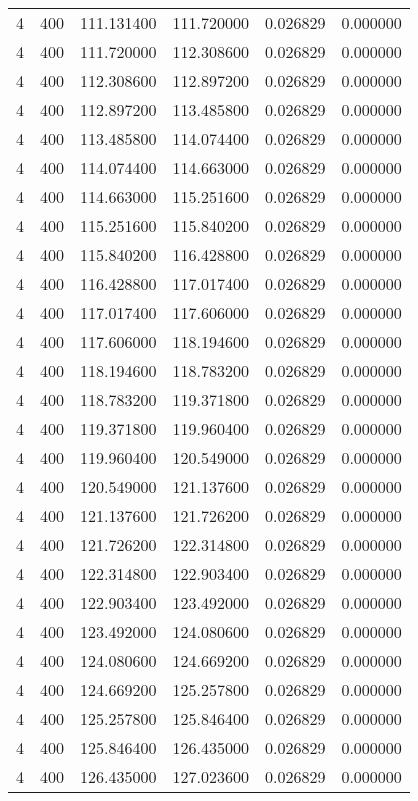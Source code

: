 \begin{longtable}{rrrrrr}
4 & 400 & 111.131400 & 111.720000 & 0.026829 & 0.000000 \\
4 & 400 & 111.720000 & 112.308600 & 0.026829 & 0.000000 \\
4 & 400 & 112.308600 & 112.897200 & 0.026829 & 0.000000 \\
4 & 400 & 112.897200 & 113.485800 & 0.026829 & 0.000000 \\
4 & 400 & 113.485800 & 114.074400 & 0.026829 & 0.000000 \\
4 & 400 & 114.074400 & 114.663000 & 0.026829 & 0.000000 \\
4 & 400 & 114.663000 & 115.251600 & 0.026829 & 0.000000 \\
4 & 400 & 115.251600 & 115.840200 & 0.026829 & 0.000000 \\
4 & 400 & 115.840200 & 116.428800 & 0.026829 & 0.000000 \\
4 & 400 & 116.428800 & 117.017400 & 0.026829 & 0.000000 \\
4 & 400 & 117.017400 & 117.606000 & 0.026829 & 0.000000 \\
4 & 400 & 117.606000 & 118.194600 & 0.026829 & 0.000000 \\
4 & 400 & 118.194600 & 118.783200 & 0.026829 & 0.000000 \\
4 & 400 & 118.783200 & 119.371800 & 0.026829 & 0.000000 \\
4 & 400 & 119.371800 & 119.960400 & 0.026829 & 0.000000 \\
4 & 400 & 119.960400 & 120.549000 & 0.026829 & 0.000000 \\
4 & 400 & 120.549000 & 121.137600 & 0.026829 & 0.000000 \\
4 & 400 & 121.137600 & 121.726200 & 0.026829 & 0.000000 \\
4 & 400 & 121.726200 & 122.314800 & 0.026829 & 0.000000 \\
4 & 400 & 122.314800 & 122.903400 & 0.026829 & 0.000000 \\
4 & 400 & 122.903400 & 123.492000 & 0.026829 & 0.000000 \\
4 & 400 & 123.492000 & 124.080600 & 0.026829 & 0.000000 \\
4 & 400 & 124.080600 & 124.669200 & 0.026829 & 0.000000 \\
4 & 400 & 124.669200 & 125.257800 & 0.026829 & 0.000000 \\
4 & 400 & 125.257800 & 125.846400 & 0.026829 & 0.000000 \\
4 & 400 & 125.846400 & 126.435000 & 0.026829 & 0.000000 \\
4 & 400 & 126.435000 & 127.023600 & 0.026829 & 0.000000 \\

\end{longtable}
